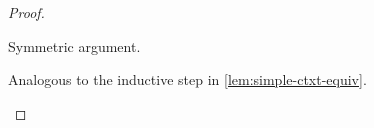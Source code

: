 \documentclass[acmsmall,screen,nonacm%
\Anonymous{,anonymous}{}%
\Final{}{,review}%
]{acmart}
\begin{document}
\begin{lemma}
\begin{proof}
\begin{proofcases}
\begin{proofcases}
	\begin{llproof}
	  \vdashPf{\semenv\where{\x \is \gabsr}}{\Cp\where{\ca}}{\ditto}
	  \vdashPf{\semenv\where{\x \is \gabsr}}{\Cp\where{\cb}}{$\ddagger$}
	\end{llproof}
	  \proofcase{$\impliedby$}

	  \begin{llproof}
	    Symmetric argument.
	  \end{llproof}
	\end{proofcases}


      \begin{llproof}
	Analogous to the inductive step in \cref{lem:simple-ctxt-equiv}.
      \end{llproof}
    \end{proofcases}
  \end{proof}
\end{lemma}
\end{document}
